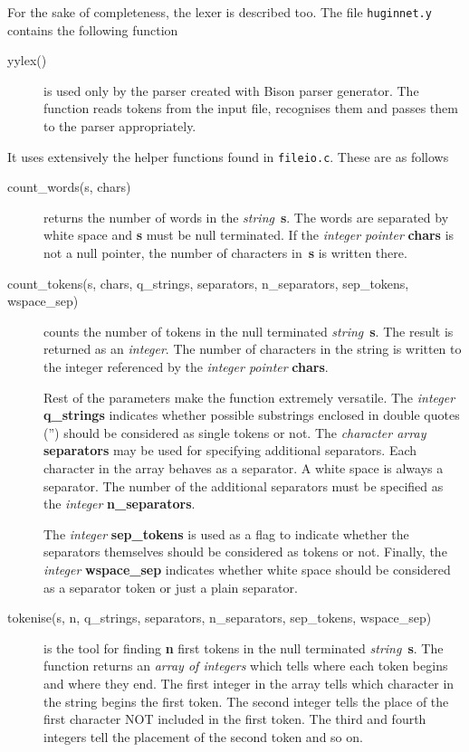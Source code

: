 \documentclass[12pt,a4paper]{report}
\newcommand{\cdatatype}[1]{{\it #1}}
\newcommand{\cfilename}[1]{\texttt{#1}}
\newcommand{\cparameter}[1]{\textbf{#1}}
\begin{document}
For the sake of completeness, the lexer is described too. The file 
\cfilename{huginnet.y} contains the following function
\begin{description}
\item[yylex()] is used only by the parser created with Bison parser
generator. The function reads tokens from the input file, recognises
them and passes them to the parser appropriately.
\end{description}
It uses extensively the helper functions found in
\cfilename{fileio.c}. These are as follows
\begin{description}
\item[count\_words(s, chars)] returns the number of words in the 
\cdatatype{string}~\cparameter{s}. The words are separated by white 
space and \cparameter{s} must be null terminated. If the 
\cdatatype{integer pointer} \cparameter{chars} is not a null pointer, 
the number of characters in~\cparameter{s} is written there.

\item[count\_tokens(s, chars, q\_strings, separators,
n\_separators, sep\_tokens, wspace\_sep)] counts the number of
tokens in the null terminated \cdatatype{string}~\cparameter{s}. The 
result is returned as an \cdatatype{integer}. The number of characters 
in the string is written to the integer referenced by the 
\cdatatype{integer pointer} \cparameter{chars}. 

Rest of the parameters make the function extremely versatile. The 
\cdatatype{integer} \cparameter{q\_strings} indicates whether possible
substrings enclosed in double quotes ('') should be considered as
single tokens or not. The \cdatatype{character array} 
\cparameter{separators} may be used for specifying additional
separators. Each character in the array behaves as a separator. 
A white space is always a separator. The number of the additional 
separators must be specified as the \cdatatype{integer} 
\cparameter{n\_separators}.

The \cdatatype{integer} \cparameter{sep\_tokens} is used as a flag 
to indicate whether the separators themselves should be considered as 
tokens or not. Finally, the \cdatatype{integer}
\cparameter{wspace\_sep} indicates whether white space should be 
considered as a separator token or just a plain separator.

\item[tokenise(s, n, q\_strings, separators, n\_separators, 
sep\_tokens, wspace\_sep)] is the tool for finding \cparameter{n} first 
tokens in the null terminated \cdatatype{string}~\cparameter{s}. The 
function returns an \cdatatype{array of integers} which tells where 
each token begins and where they end. The first integer in the array 
tells which character in the string begins the first token. The second
integer tells the place of the first character NOT included in the
first token. The third and fourth integers tell the placement of the
second token and so on.


\end{description}
\end{document}
